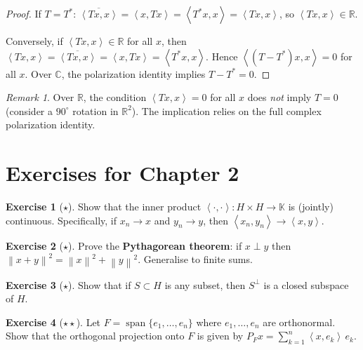 \documentclass[a4paper,12pt]{book}
\DeclareMathOperator{\spn}{span}
\newcommand{\R}{\mathbb{R}}
\newcommand{\C}{\mathbb{C}}
\newcommand{\K}{\mathbb{K}}
\newcommand{\norm}[1]{\left\| #1 \right\|}
\newcommand{\inner}[2]{\left\langle #1, #2 \right\rangle}
\theoremstyle{definition}
\newtheorem{exercise}{Exercise}[chapter]
\theoremstyle{plain}
\theoremstyle{remark}
\newtheorem{remark}[definition]{Remark}
\begin{document}
\begin{proof}
If $T=T^*$: $\overline{\inner{Tx}{x}}=\inner{x}{Tx}=\inner{T^*x}{x}=\inner{Tx}{x}$,
so $\inner{Tx}{x}\in\R$.

Conversely, if $\inner{Tx}{x}\in\R$ for all $x$, then
$\inner{Tx}{x}=\overline{\inner{Tx}{x}}=\inner{x}{Tx}=\inner{T^*x}{x}$.
Hence $\inner{(T-T^*)x}{x}=0$ for all $x$.  Over $\C$, the polarization
identity implies $T-T^*=0$.
\end{proof}

\begin{remark}
\label{rem:real-case-warning}
Over $\R$, the condition $\inner{Tx}{x}=0$ for all $x$ does \emph{not}
imply $T=0$ (consider a $90^\circ$ rotation in $\R^2$).  The implication
relies on the full complex polarization identity.
\end{remark}

\section{Exercises for Chapter 2}
\label{sec:ex-ch2}

\begin{exercise}[$\star$]
\label{exo:inner-product-continuous}
Show that the inner product $\inner{\cdot}{\cdot}:H\times H\to\K$ is
(jointly) continuous.  Specifically, if $x_n\to x$ and $y_n\to y$,
then $\inner{x_n}{y_n}\to\inner{x}{y}$.
\end{exercise}

\begin{exercise}[$\star$]
\label{exo:orthogonal-pythagorean}
Prove the \textbf{Pythagorean theorem}: if $x\perp y$ then
$\norm{x+y}^2=\norm{x}^2+\norm{y}^2$.  Generalise to finite sums.
\end{exercise}

\begin{exercise}[$\star$]
\label{exo:closed-subspace-perp}
Show that if $S\subset H$ is any subset, then $S^\perp$ is a closed
subspace of $H$.
\end{exercise}

\begin{exercise}[$\star\star$]
\label{exo:projection-formula}
Let $F=\spn\{e_1,\dots,e_n\}$ where $e_1,\dots,e_n$ are orthonormal.
Show that the orthogonal projection onto $F$ is given by
$P_F x = \sum_{k=1}^n\inner{x}{e_k}\,e_k$.
\end{exercise}
\end{document}
